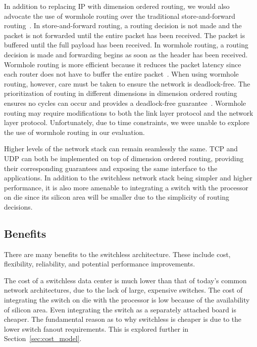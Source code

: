 In addition to replacing IP with dimension ordered routing, we would also advocate the use of wormhole routing over the traditional store-and-forward routing~\cite{Ni:1993:SWRTDN}.  In store-and-forward routing, a routing decision is not made and the packet is not forwarded until the entire packet has been received.  The packet is buffered until the full payload has been received.  In wormhole routing, a routing decision is made and forwarding begins as soon as the header has been received.  Wormhole routing is more efficient because it reduces the packet latency since each router does not have to buffer the entire packet~\cite{Boppana:1995:FTWRAMN,Dally:1987:DFMRMIN,Ni:1993:SWRTDN}.  When using wormhole routing, however, care must be taken to ensure the network is deadlock-free.  The prioritization of routing in different dimensions in dimension ordered routing ensures no cycles can occur and provides a deadlock-free guarantee~\cite{Ni:1993:SWRTDN}.  Wormhole routing may require modifications to both the link layer protocol and the network layer protocol.  Unfortunately, due to time constraints, we were unable to explore the use of wormhole routing in our evaluation.

Higher levels of the network stack can remain seamlessly the same.  TCP and UDP can both be implemented on top of dimension ordered routing, providing their corresponding guarantees and exposing the same interface to the applications. In addition to the switchless network stack being simpler and higher performance, it is also more amenable to integrating a switch with the processor on die since its silicon area will be smaller due to the simplicity of routing decisions.

\subsection{Benefits}

There are many benefits to the switchless architecture.  These include cost, flexibility, reliability, and potential performance improvements.  

The cost of a switchless data center is much lower than that of today's common network architectures, due to the lack of large, expensive switches.  The cost of integrating the switch on die with the processor is low because of the availability of silicon area.  Even integrating the switch as a separately attached board is cheaper.  The fundamental reason as to why switchless is cheaper is due to the lower switch fanout requirements.  This is explored further in Section~\ref{sec:cost_model}.

